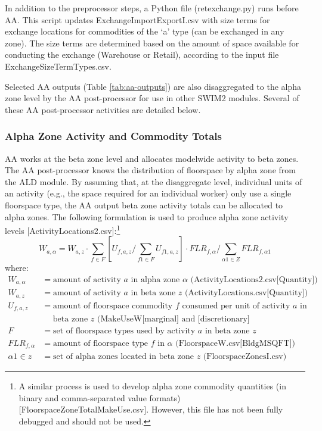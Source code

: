 In addition to the preprocessor steps, a Python file (retexchange.py) runs before AA. This script updates ExchangeImportExportI.csv with size terms for exchange locations for commodities of the `a' type (can be exchanged in any zone). The size terms are determined based on the amount of space available for conducting the exchange (Warehouse or Retail), according to the input file ExchangeSizeTermTypes.csv.

Selected AA outputs (Table \ref{tab:aa-outputs}) are also disaggregated to the alpha zone level by the AA post-processor for use in other SWIM2 modules. Several of these AA post-processor activities are detailed below.

\subsubsection{Alpha Zone Activity and Commodity Totals}
AA works at the beta zone level and allocates modelwide activity to beta zones. The AA post-processor knows the distribution of floorspace by alpha zone from the ALD module. By assuming that, at the disaggregate level, individual units of an activity (e.g., the space required for an individual worker) only use a single floorspace type, the AA output beta zone activity totals can be allocated to alpha zones. The following formulation is used to produce alpha zone activity levels [ActivityLocations2.csv]:\footnote{A similar process is used to develop alpha zone commodity quantities (in binary and comma-separated value formats) [FloorspaceZoneTotalMakeUse.csv]. However, this file has not been fully debugged and should not be used.}
\begin{equation}\label{eq:6.40}
W_{a,\alpha} = W_{a,z} \cdot \sum_{f \in F} \left[ U_{f,a,z} / \sum_{f1 \in F} U_{f1,a,z} \right] \cdot FLR_{f,\alpha} / \sum_{\alpha 1 \in Z} FLR_{f, \alpha 1}
\end{equation}
where:
\begin{align*}
W_{a,\alpha} &= \text{amount of activity $a$ in alpha zone $\alpha$ (ActivityLocations2.csv[Quantity])} \\
W_{a,z} &= \text{amount of activity $a$ in beta zone $z$ (ActivityLocations.csv[Quantity])} \\
U_{f,a,z} &= \text{amount of floorspace commodity $f$ consumed per unit of activity $a$ in} \\
 &~~~~~~\text{beta zone $z$ (MakeUseW[marginal] and [discretionary]} \\
F &= \text{set of floorspace types used by activity $a$ in beta zone $z$} \\
FLR_{f,\alpha} &= \text{amount of floorspace type $f$ in $\alpha$ (FloorspaceW.csv[BldgMSQFT])} \\
\alpha 1 \in z &= \text{set of alpha zones located in beta zone $z$ (FloorspaceZonesI.csv)} 
\end{align*}


